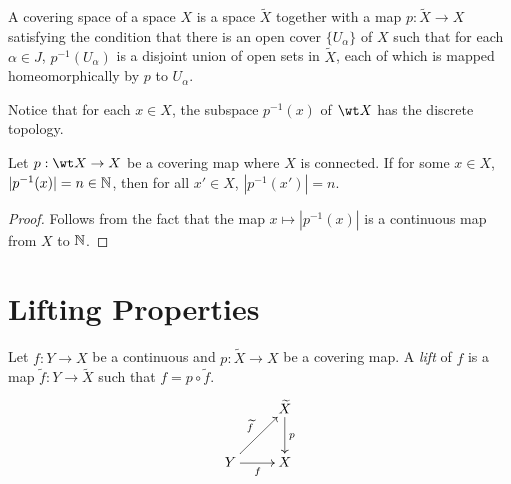 \begin{definition}
    A covering space of a space $X$ is a space $\widetilde X$ together with a map $p:\widetilde X\to X$ satisfying the condition that there is an open cover $\{U_\alpha\}$ of $X$ such that for each $\alpha\in J$, $p^{-1}(U_\alpha)$ is a disjoint union of open sets in $\widetilde X$, each of which is mapped homeomorphically by $p$ to $U_\alpha$.
\end{definition}

Notice that for each $x\in X$, the subspace $p^{-1}(x)$ of $\wt X$ has the discrete topology. 

\begin{proposition}
    Let $p:\wt X\to X$ be a covering map where $X$ is connected. If for some $x\in X$, $|p^{-1}(x)| = n\in\mathbb{N}$, then for all $x'\in X$, $|p^{-1}(x')| = n$.
\end{proposition}
\begin{proof}
    Follows from the fact that the map $x\mapsto|p^{-1}(x)|$ is a continuous map from $X$ to $\mathbb{N}$.
\end{proof}

\section{Lifting Properties}

\begin{definition}[Lift]
    Let $f: Y\to X$ be a continuous and $p:\widetilde X\to X$ be a covering map. A \textit{lift} of $f$ is a map $\widetilde f: Y\to\widetilde X$ such that $f = p\circ\widetilde f$. 
    \begin{equation*}
        \xymatrix{
            & {\widetilde X}\ar[d]^p\\
            Y\ar[r]_f\ar[ru]^{\widetilde f} & X
        }
    \end{equation*}
\end{definition}


